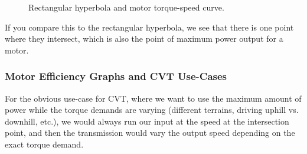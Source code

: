 \documentclass[12pt]{article}
\begin{document}
\begin{figure}[H]
  \centering
  
  \caption{Rectangular hyperbola and motor torque-speed curve.}\label{fig:ts_comparisons}
\end{figure}

If you compare this to the rectangular hyperbola, we see that there is one point where they intersect, which is also the point of maximum power output for a motor.

\subsubsection{Motor Efficiency Graphs and CVT Use-Cases}
For the obvious use-case for CVT, where we want to use the maximum amount of power while the torque demands are varying (different terrains, driving uphill vs. downhill, etc.), we would always run our input at the speed at the intersection point, and then the transmission would vary the output speed depending on the exact torque demand.
\end{document}

